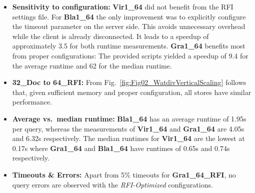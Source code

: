 \documentclass[twocolumn]{bmcart}%
\begin{document}
%
%
%
\begin{itemize}
	\item \textbf{Sensitivity to configuration:} \textbf{Vir1\_64} did not benefit from the RFI settings file. For \textbf{Bla1\_64} the only improvement was to explicitly configure the timeout parameter on the server side. This avoids unnecessary overhead while the client is already disconnected. It leads to a speedup of approximately 3.5 for both runtime measurements. \textbf{Gra1\_64} benefits most from proper configurations: The provided scripts yielded a speedup of 9.4 for the average runtime and 62 for the median runtime.
	\item \textbf{32\_Doc to 64\_RFI:} From Fig.~\ref{fig:Fig02_WatdivVerticalScaling} follows that, given sufficient memory and proper configuration, all stores have similar performance.
	\item \textbf{Average vs.\ median runtime:} \textbf{Bla1\_64} has an average runtime of 1.95s per query, whereas the measurements of \textbf{Vir1\_64} and \textbf{Gra1\_64} are 4.05s and 6.32s respectively. The median runtimes for \textbf{Vir1\_64} are the lowest at 0.17s where \textbf{Gra1\_64} and \textbf{Bla1\_64} have runtimes of 0.65s and 0.74s respectively.
	\item \textbf{Timeouts \& Errors:} Apart from 5\% timeouts for \textbf{Gra1\_64\_RFI}, no query errors are observed with the \emph{RFI-Optimized} configurations.
\end{itemize}
\end{document}
